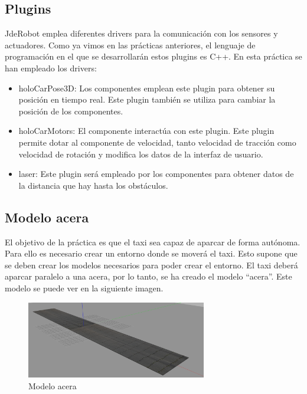 \subsection{Plugins}
JdeRobot emplea diferentes drivers para la comunicación con los sensores y actuadores. Como ya vimos en las prácticas anteriores, el lenguaje de programación en el que se desarrollarán estos plugins es C++. En esta práctica se han empleado los drivers:

\begin{itemize}
\item holoCarPose3D: Los componentes emplean este plugin para obtener su posición en tiempo real. Este plugin también se utiliza para cambiar la posición de los componentes.
\item holoCarMotors: El componente interactúa con este plugin. Este plugin permite dotar al componente de velocidad, tanto velocidad de tracción como velocidad de rotación y modifica los datos de la interfaz de usuario.
\item laser: Este plugin será empleado por los componentes para obtener datos de la distancia que hay hasta los obstáculos.
\end{itemize}

\subsection{Modelo acera}
El objetivo de la práctica es que el taxi sea capaz de aparcar de forma autónoma. Para ello es necesario crear un entorno donde se moverá el taxi. Esto supone que se deben crear los modelos necesarios para poder crear el entorno. El taxi deberá aparcar paralelo a una acera, por lo tanto, se ha creado el modelo ``acera''. Este modelo se puede ver en la siguiente imagen.\\

\begin{figure}[H]
  \begin{center}
    \includegraphics[width=0.7\textwidth]{figures/Autopark/acera.png}
		\caption{Modelo acera}
		\label{fig.acera}
		\end{center}
\end{figure}

